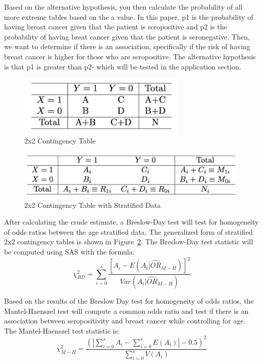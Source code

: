 \documentclass[12pt, titlepage]{article}
\begin{document}
Based on the alternative hypothesis, you then calculate the probability of 
all more extreme tables based on the a value. In this paper, p1 is the
probability of having breast cancer given that the patient is seropositive
and p2 is the probability of having breat cancer given that the patient
is seronegative. Then, we want to determine if there is an association,
specifically if the risk of having breast cancer is higher for those who
are seropositive. The alternative hypothesis is that p1 is greater than p2-
which will be tested in the application section.

\begin{figure}[tbp]
  \centering
  \includegraphics[width=8cm]{table.png}
  \caption{2x2 Contingency Table}
  \label{fig:table}
\end{figure}

\begin{figure}[tbp]
  \centering
  \includegraphics[width=12cm]{2x2 stratified table.png}
  \caption{2x2 Contingency Table with Stratified Data}
  \label{fig:strat}
\end{figure}


After calculating the crude estimate, a Breslow-Day test will test for 
homogeneity of odds ratios between the age stratified data. The generalized
form of stratified 2x2 contingency tables is shown in Figure~\ref{fig:strat}.
The Breslow-Day test statistic will be computed using SAS with the formula:
\begin{equation}
  \chi_{BD}^2=\displaystyle\sum\limits_{i=0}^s\frac{[A_i-E(A_i|\hat{OR}_{M-H})]^2}{Var(A_i|\hat{OR}_{M-H})}
\end{equation}

Based on the results of the Breslow Day test for homogeneity of odds ratios,
the Mantel-Haenszel test will compute a common odds ratio and test if there 
is an association between seropositivity and breast cancer while controlling 
for age. The Mantel-Haenszel test statistic is:
\begin{equation}
  \chi_{M-H}^2=\frac{(|\sum\limits_{i=0}^s A_i - \sum\limits_{i=0}^sE(A_i)|-0.5)^2}
{\sum\limits_{i=0}^s V(A_i)}
\end{equation}
\end{document}
